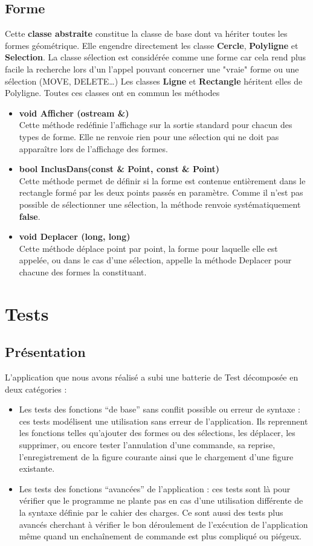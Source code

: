 \documentclass[12pt]{article}
\begin{document}
\subsection{Forme}
Cette \textbf{classe abstraite} constitue la classe de base dont va hériter toutes les formes géométrique. Elle engendre directement les classe \textbf{Cercle}, \textbf{Polyligne} et \textbf{Selection}. La classe sélection est considérée comme une forme car cela rend plus facile la recherche lors d'un l'appel pouvant concerner une "vraie" forme ou une sélection (MOVE, DELETE\ldots)  Les classes \textbf{Ligne} et \textbf{Rectangle} héritent elles de Polyligne. Toutes ces classes ont en commun les méthodes
\begin{itemize}
\item\textbf{void Afficher (ostream \&)}\\
Cette méthode redéfinie l'affichage sur la sortie standard pour chacun des types de forme. Elle ne renvoie rien pour une sélection qui ne doit pas apparaître lors de l'affichage des formes.
\item \textbf{bool InclusDans(const \& Point, const \& Point)}\\
 Cette méthode permet de définir si la forme est contenue entièrement dans le rectangle formé par les deux points passés en paramètre. Comme il n'est pas possible de sélectionner une sélection, la méthode renvoie systématiquement \textbf{false}.
\item\textbf{void Deplacer (long, long)}\\
Cette méthode déplace point par point, la forme pour laquelle elle est appelée, ou dans le cas d'une sélection, appelle la méthode Deplacer pour chacune des formes la constituant.
\end{itemize}

\section{Tests}
\subsection{Présentation}
L’application que nous avons réalisé a subi une batterie de Test décomposée en deux catégories :
\begin{itemize}
\item Les tests des fonctions “de base” sans conflit possible ou erreur de syntaxe : ces tests modélisent une utilisation sans erreur de l’application. Ils reprennent les fonctions telles qu’ajouter des formes ou des sélections, les déplacer, les supprimer, ou encore tester l’annulation d’une commande, sa reprise, l’enregistrement de la figure courante ainsi que le chargement d’une figure existante.
\item Les tests des fonctions “avancées” de l’application : ces tests sont là pour vérifier que le programme ne plante pas en cas d’une utilisation différente de la syntaxe définie par le cahier des charges. Ce sont aussi des tests plus avancés cherchant à vérifier le bon déroulement de l'exécution de l'application même quand un enchaînement de commande est plus compliqué ou piégeux.
\end{itemize}
\end{document}
